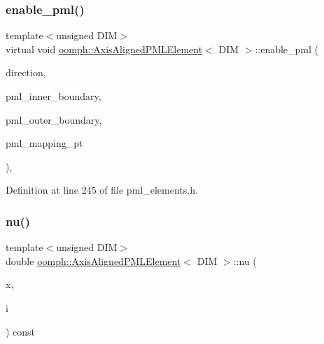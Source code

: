 \subsubsection{\texorpdfstring{enable\+\_\+pml()}{enable\_pml()}\hspace{0.1cm}{\footnotesize\ttfamily [2/2]}}
{\footnotesize\ttfamily template$<$unsigned D\+IM$>$ \\
virtual void \hyperlink{classoomph_1_1AxisAlignedPMLElement}{oomph\+::\+Axis\+Aligned\+P\+M\+L\+Element}$<$ D\+IM $>$\+::enable\+\_\+pml (\begin{DoxyParamCaption}\item[{const int \&}]{direction,  }\item[{const double \&}]{pml\+\_\+inner\+\_\+boundary,  }\item[{const double \&}]{pml\+\_\+outer\+\_\+boundary,  }\item[{\hyperlink{classoomph_1_1UniaxialPMLMapping}{Uniaxial\+P\+M\+L\+Mapping} $\ast$}]{pml\+\_\+mapping\+\_\+pt }\end{DoxyParamCaption})\hspace{0.3cm}{\ttfamily [inline]}, {\ttfamily [virtual]}}



Definition at line 245 of file pml\+\_\+elements.\+h.

\mbox{\label{classoomph_1_1AxisAlignedPMLElement_a554c5768cdf2543b76a507dacd7fe54b}} 
\subsubsection{\texorpdfstring{nu()}{nu()}\hspace{0.1cm}{\footnotesize\ttfamily [1/2]}}
{\footnotesize\ttfamily template$<$unsigned D\+IM$>$ \\
double \hyperlink{classoomph_1_1AxisAlignedPMLElement}{oomph\+::\+Axis\+Aligned\+P\+M\+L\+Element}$<$ D\+IM $>$\+::nu (\begin{DoxyParamCaption}\item[{const \hyperlink{classoomph_1_1Vector}{Vector}$<$ double $>$ \&}]{x,  }\item[{const unsigned \&}]{i }\end{DoxyParamCaption}) const\hspace{0.3cm}{\ttfamily [inline]}}



